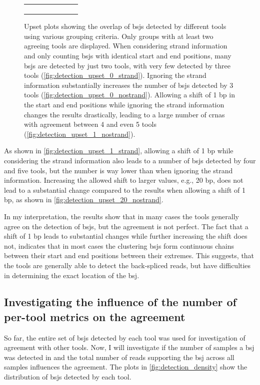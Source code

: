 \begin{figure}[ht]
\begin{tabular}{cc}
{\begin{subfigure}{\textwidth}
                       \end{subfigure}}\end{tabular} \caption{Upset plots
        showing the overlap of
        \gls{bsj}s detected by different tools using various grouping criteria.
        Only groups with at least two agreeing tools are displayed.
        When considering strand information and only counting \gls{bsj}s with identical
        start and end positions, many \gls{bsj}s are detected by just two tools, with
        very few detected by three tools (\cref{fig:detection_upset_0_strand}).
        Ignoring the strand information substantially increases the number of
        \gls{bsj}s detected by 3 tools (\cref{fig:detection_upset_0_nostrand}).
        Allowing a shift of 1 bp in the start and end positions while ignoring the
        strand information changes the results drastically, leading to a large number
        of \gls{crna}s with agreement between 4 and even 5 tools
        (\cref{fig:detection_upset_1_nostrand}).
    }
    \label{fig:detection_upset}
\end{figure}

As shown in \cref{fig:detection_upset_1_strand}, allowing a shift of 1 bp while
considering the strand information also leads to a number of \gls{bsj}s
detected by four and five tools, but the number is way lower than when ignoring
the strand information.
Increasing the allowed shift to larger values, e.g., 20 bp, does not lead to a
substantial change compared to the results when allowing a shift of 1 bp, as
shown in \cref{fig:detection_upset_20_nostrand}.

In my interpretation, the results show that in many cases the tools generally
agree on the detection of \gls{bsj}s, but the agreement is not perfect.
The fact that a shift of 1 bp leads to substantial changes while further
increasing the shift does not, indicates that in most cases the clustering
\gls{bsj}s form continuous chains between their start and end positions between
their extremes.
This suggests, that the tools are generally able to detect the back-spliced
reads, but have difficulties in determining the exact location of the
\gls{bsj}.

\subsection{Investigating the influence of the number of per-tool metrics on
    the agreement}

So far, the entire set of \gls{bsj}s detected by each tool was used for
investigation of agreement with other tools.
Now, I will investigate if the number of samples a \gls{bsj} was detected in
and the total number of reads supporting the \gls{bsj} across all samples
influences the agreement.
The plots in \cref{fig:detection_density} show the distribution of \gls{bsj}s
detected by each tool.

